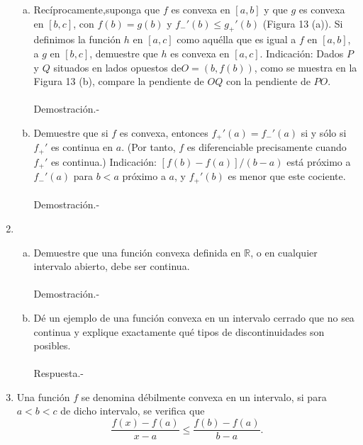 \begin{enumerate}[\bfseries 1.]
\begin{enumerate}[(a)]
	    \item Recíprocamente,suponga que $f$ es convexa en $[a, b]$ y que $g$ es convexa en $[b, c]$, con $f(b) = g(b)$ y $f_-'(b)\leq g_+'(b)$ (Figura 13 (a)). Si definimos la función $h$ en $[a, c]$ como aquélla que es igual a $f$ en $[a,b]$, a $g$ en $[b,c]$, demuestre que $h$ es convexa en $[a, c]$. Indicación: Dados $P$ y $Q$ situados en lados opuestos de$O=(b, f(b))$, como se muestra en la Figura 13 (b), compare la pendiente de $OQ$ con la pendiente de $PO$.\\\\
		Demostración.-\;
	
	    \item Demuestre que si $f$ es convexa, entonces $f_+'(a)=f_-'(a)$ si y sólo si $f_+'$ es continua en $a$. (Por tanto, $f$ es diferenciable precisamente cuando $f_+'$ es continua.) Indicación: $[f(b)-f(a)]/(b-a)$ está próximo a $f_-'(a)$ para $b<a$ próximo a $a$, y $f_+'(b)$ es menor que este cociente.\\\\
		Demostración.-\;

	\end{enumerate}


    \item
	\begin{enumerate}[a)]

	    \item Demuestre que una función convexa definida en $\mathbb{R}$, o en cualquier intervalo abierto, debe ser continua.\\\\
		Demostración.-\; 

	    \item Dé un ejemplo de una función convexa en un intervalo cerrado que no sea continua y explique exactamente qué tipos de discontinuidades son posibles. \\\\
		Respuesta.-\; 

	\end{enumerate}

    \item Una función $f$ se denomina débilmente convexa en un intervalo, si para $a < b < c$ de dicho intervalo, se verifica que 
    $$\dfrac{f(x)-f(a)}{x-a}\leq \dfrac{f(b)-f(a)}{b-a}.$$

	\begin{enumerate}[(a)]


\end{enumerate}
\end{enumerate}
